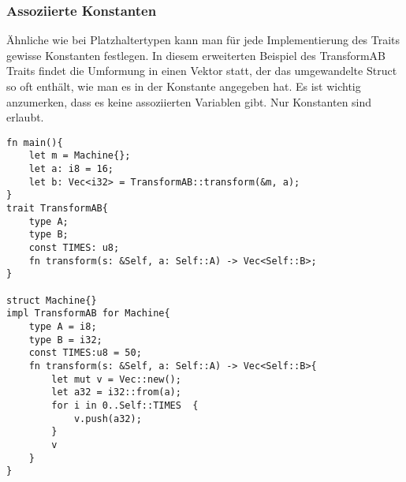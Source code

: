 \documentclass[a4paper, 1ppt]{article}
\begin{document}
\subsubsection{Assoziierte Konstanten}
Ähnliche wie bei Platzhaltertypen kann man für jede Implementierung des Traits gewisse Konstanten festlegen. In diesem erweiterten Beispiel des TransformAB Traits findet die Umformung in einen Vektor statt, der das umgewandelte Struct so oft enthält, wie man es in der Konstante angegeben hat.
Es ist wichtig anzumerken, dass es keine assoziierten Variablen gibt. Nur Konstanten sind erlaubt.
\begin{verbatim}
fn main(){
    let m = Machine{};
    let a: i8 = 16;
    let b: Vec<i32> = TransformAB::transform(&m, a);
}
trait TransformAB{
    type A;
    type B;
    const TIMES: u8;
    fn transform(s: &Self, a: Self::A) -> Vec<Self::B>;
}

struct Machine{}
impl TransformAB for Machine{
    type A = i8;
    type B = i32;
    const TIMES:u8 = 50;
    fn transform(s: &Self, a: Self::A) -> Vec<Self::B>{
        let mut v = Vec::new();
        let a32 = i32::from(a);
        for i in 0..Self::TIMES  {
            v.push(a32);
        }
        v
    }
}
\end{verbatim}
\end{document}
